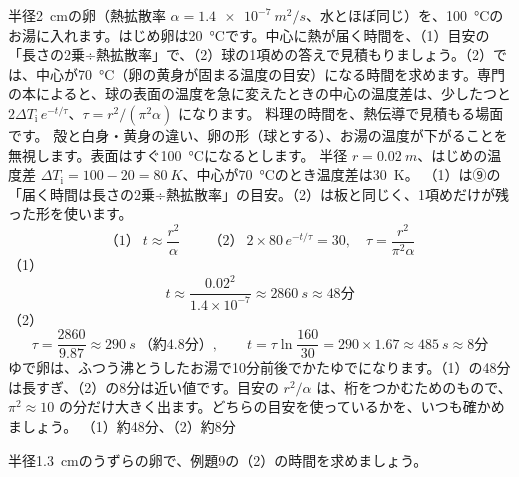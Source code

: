 \label{ph:熱-11:ex9}
\begin{phreidai}[ゆで卵の中心に熱が届く時間]
半径\qty{2}{cm}の卵（熱拡散率 $\alpha=\qty{1.4e-7}{m^2/s}$、水とほぼ同じ）を、\qty{100}{\celsius}のお湯に入れます。はじめ卵は\qty{20}{\celsius}です。中心に熱が届く時間を、（1）目安の「長さの2乗÷熱拡散率」で、（2）球の1項めの答えで見積もりましょう。（2）では、中心が\qty{70}{\celsius}（卵の黄身が固まる温度の目安）になる時間を求めます。専門の本によると、球の表面の温度を急に変えたときの中心の温度差は、少したつと $2\Delta T_{\mathrm i}\,e^{-t/\tau}$、$\tau=r^2/(\pi^2\alpha)$ になります。
\phbamen
料理の時間を、熱伝導で見積もる場面です。
\phmushi
殻と白身・黄身の違い、卵の形（球とする）、お湯の温度が下がることを無視します。表面はすぐ\qty{100}{\celsius}になるとします。
\phzu
半径 $r=\qty{0.02}{m}$、はじめの温度差 $\Delta T_{\mathrm i}=100-20=\qty{80}{K}$、中心が\qty{70}{\celsius}のとき温度差は\qty{30}{K}。
\phriyu
（1）は⑨の「届く時間は長さの2乗÷熱拡散率」の目安。（2）は板と同じく、1項めだけが残った形を使います。
\phtateru
\[（1）\ t\approx\frac{r^2}{\alpha}\qquad（2）\ 2\times80\,e^{-t/\tau}=30,\quad\tau=\frac{r^2}{\pi^2\alpha}\]
\phtoku
（1）\[t\approx\frac{0.02^2}{1.4\times10^{-7}}\approx\qty{2860}{s}\approx48\text{分}\]
（2）\[\tau=\frac{2860}{9.87}\approx\qty{290}{s}\ \text{（約4.8分）},\qquad t=\tau\ln\frac{160}{30}=290\times1.67\approx\qty{485}{s}\approx8\text{分}\]
\phtashikame
ゆで卵は、ふつう沸とうしたお湯で10分前後でかたゆでになります。（1）の48分は長すぎ、（2）の8分は近い値です。目安の $r^2/\alpha$ は、桁をつかむためのもので、$\pi^2\approx10$ の分だけ大きく出ます。どちらの目安を使っているかを、いつも確かめましょう。
\kotae （1）約48分、（2）約8分
\end{phreidai}
\begin{jibun}
半径\qty{1.3}{cm}のうずらの卵で、例題9の（2）の時間を求めましょう。
\end{jibun}

